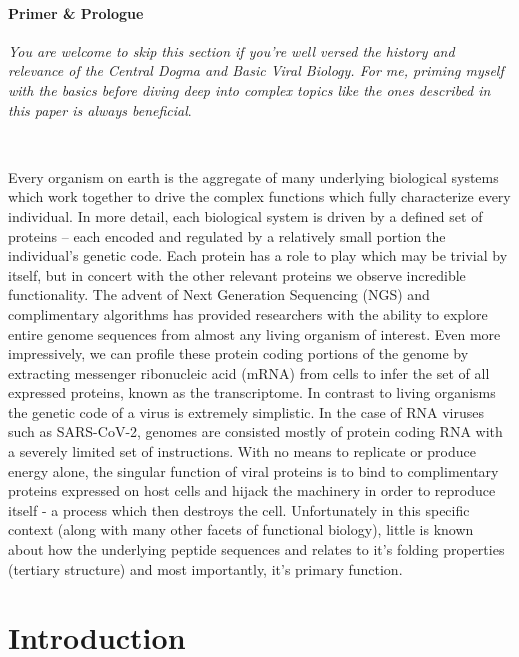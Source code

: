 \documentclass{article}
\begin{document}
\paragraph{Primer \& Prologue}
\textit{You are welcome to skip this section if you're well versed the history and relevance of the Central Dogma and Basic Viral Biology. 
For me, priming myself with the basics before diving deep into complex topics like the ones described in this paper is always beneficial}.

~

Every organism on earth is the aggregate of many underlying biological systems which work together to drive the complex functions which fully characterize every individual.
In more detail, each biological system is driven by a defined set of proteins -- each encoded and regulated by a relatively small portion the individual's genetic code.
Each protein has a role to play which may be trivial by itself, but in concert with the other relevant proteins we observe incredible functionality. 
The advent of Next Generation Sequencing (NGS) and complimentary algorithms has provided researchers with the ability to explore entire genome sequences from almost any living organism of interest.
Even more impressively, we can profile these protein coding portions of the genome by extracting messenger ribonucleic acid (mRNA) from cells to infer the set of all expressed proteins, known as the transcriptome. 
In contrast to living organisms the genetic code of a virus is extremely simplistic. 
In the case of RNA viruses such as SARS-CoV-2, genomes are consisted mostly of protein coding RNA with a severely limited set of instructions.
With no means to replicate or produce energy alone, the singular function of viral proteins is to bind to complimentary proteins expressed on host cells and hijack the machinery in order to reproduce itself - a process which then destroys the cell.
Unfortunately in this specific context (along with many other facets of functional biology), little is known about how the underlying peptide sequences and relates to it's folding properties (tertiary structure) and most importantly, it's primary function.

\section*{Introduction}
\end{document}
